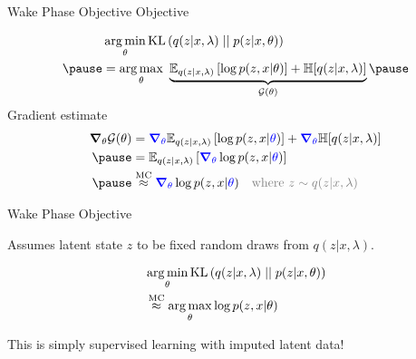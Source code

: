 \begin{frame}{Wake Phase Objective}
Objective  %

\vspace{-15pt}

\begin{equation*}
\begin{aligned}
&\argmin_{\theta} \KL{q(z|x, \lambda)}{p(z|x, \theta)} \\ \pause
&= \argmax_{\theta}~ \underbrace{\mathbb E_{q(z|x, \lambda)}\left[ \log p(z, x| \theta) \right] + \mathbb H[q(z|x, \lambda)]}_{\mathcal G(\theta)}  \pause
\end{aligned}
\end{equation*}
\vspace{-2pt}
Gradient estimate
\begin{equation*}
\begin{aligned}
\grad_\theta \mathcal G(\theta) &= \textcolor{blue}{\grad_\theta}  \mathbb E_{q(z|x, {\lambda})}\left[ \log p(z, x| \textcolor{blue}{\theta}) \right] + \textcolor{blue}{\grad_\theta} \mathbb H[q(z|x, {\lambda})] \\ \pause 
&=\mathbb E_{q(z|x, {\lambda})}\left[ \textcolor{blue}{\grad_\theta} \log p(z, x| \textcolor{blue}{\theta}) \right] \\ \pause
&\overset{\text{MC}}{\approx} \textcolor{blue}{\grad_\theta} \log p(z, x| \textcolor{blue}{\theta}) \quad \textcolor{gray}{\text{where } z \sim q(z|x, \lambda)}
\end{aligned}
\end{equation*} 
 
\end{frame}

\begin{frame}{Wake Phase Objective}

Assumes latent state $ z $ to be fixed random draws from $ q(z|x,\lambda) $.

\begin{equation*}
\begin{aligned}
&\operatorname*{arg\,min}_{\theta} \operatorname{KL}\left(q(z|x, \lambda)\mid\mid p(z|x, \theta)\right) \\ 
&\overset{\text{MC}}{\approx} \operatorname*{arg\,max}_\theta \log p(z, x| \theta) 
\end{aligned}
\end{equation*} 

This is simply supervised learning with imputed latent data!

\end{frame}


